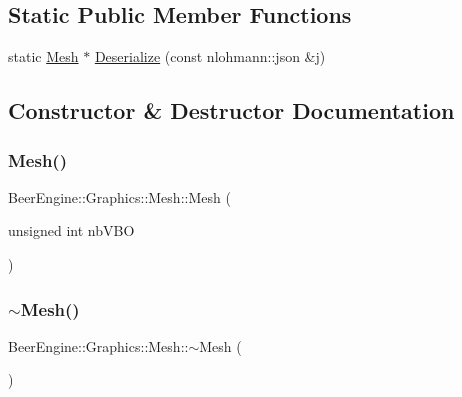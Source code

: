 \subsection*{Static Public Member Functions}
\begin{DoxyCompactItemize}
\item 
static \mbox{\hyperlink{class_beer_engine_1_1_graphics_1_1_mesh}{Mesh}} $\ast$ \mbox{\hyperlink{class_beer_engine_1_1_graphics_1_1_mesh_af7f37a0b7df0a483a837d1b59faa96b8}{Deserialize}} (const nlohmann\+::json \&j)
\end{DoxyCompactItemize}


\subsection{Constructor \& Destructor Documentation}
\mbox{\label{class_beer_engine_1_1_graphics_1_1_mesh_ae159a28de064d54eb46449409fc9fe4c}} 
\subsubsection{\texorpdfstring{Mesh()}{Mesh()}}
{\footnotesize\ttfamily Beer\+Engine\+::\+Graphics\+::\+Mesh\+::\+Mesh (\begin{DoxyParamCaption}\item[{unsigned int}]{nb\+V\+BO }\end{DoxyParamCaption})}

\mbox{\label{class_beer_engine_1_1_graphics_1_1_mesh_a431d1ff7416183e410ffd9b7de1bace3}} 
\subsubsection{\texorpdfstring{$\sim$\+Mesh()}{~Mesh()}}
{\footnotesize\ttfamily Beer\+Engine\+::\+Graphics\+::\+Mesh\+::$\sim$\+Mesh (\begin{DoxyParamCaption}{ }\end{DoxyParamCaption})}



